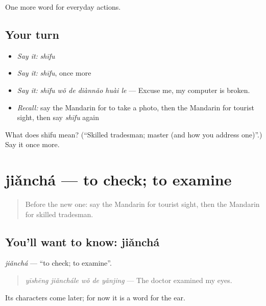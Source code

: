 \begin{grammarlens}[title={What you've built}]
One more word for everyday actions.
\end{grammarlens}

\subsection*{Your turn}
\begin{itemize}
\raggedright
  \item \emph{Say it:} \emph{shīfu}
  \item \emph{Say it:} \emph{shīfu}, once more
  \item \emph{Say it:} \emph{shīfu wǒ de diànnǎo huài le} — Excuse me, my computer is broken.
  \item \emph{Recall:} say the Mandarin for to take a photo, then the Mandarin for tourist sight, then say \emph{shīfu} again
\end{itemize}

\begin{tcolorbox}[breakable,colback=teal!4,colframe=teal!35!black,title={Before you move on}]
What does shīfu mean? (\textquotedblleft{}Skilled tradesman; master (and how you address one)\textquotedblright{}.) Say it once more.
\end{tcolorbox}
\section[jiǎnchá]{jiǎnchá — to check; to examine}

\label{lesson:ZH-C208-jiancha}



\begin{quote}
Before the new one: say the Mandarin for tourist sight, then the Mandarin for skilled tradesman.
\end{quote}

\subsection*{You'll want to know: jiǎnchá}
\emph{jiǎnchá} — \textquotedblleft{}to check; to examine\textquotedblright{}.

\begin{quote}
\emph{yīshēng jiǎnchále wǒ de yǎnjing} — The doctor examined my eyes.
\end{quote}

Its characters come later; for now it is a word for the ear.

